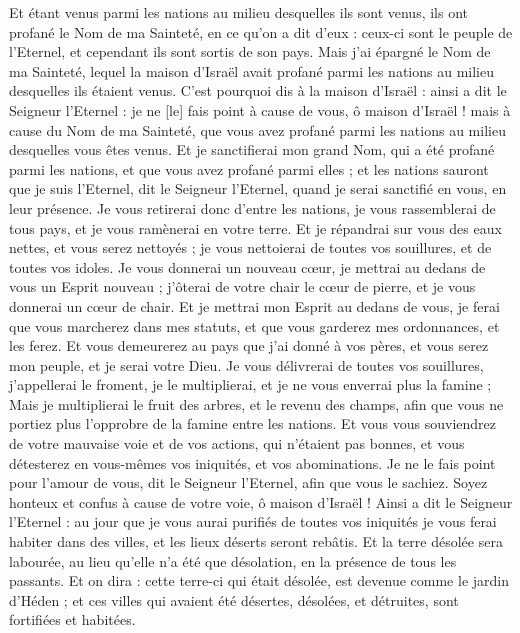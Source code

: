 \begin{multicols}{2}
Et étant venus parmi les nations au milieu desquelles ils sont venus, ils ont profané le Nom de ma Sainteté, en ce qu'on a dit d'eux : ceux-ci sont le peuple de l'Eternel, et cependant ils sont sortis de son pays.
Mais j'ai épargné le Nom de ma Sainteté, lequel la maison d'Israël avait profané parmi les nations au milieu desquelles ils étaient venus.
C'est pourquoi dis à la maison d'Israël : ainsi a dit le Seigneur l'Eternel : je ne [le] fais point à cause de vous, ô maison d'Israël ! mais à cause du Nom de ma Sainteté, que vous avez profané parmi les nations au milieu desquelles vous êtes venus.
Et je sanctifierai mon grand Nom, qui a été profané parmi les nations, et que vous avez profané parmi elles ; et les nations sauront que je suis l'Eternel, dit le Seigneur l'Eternel, quand je serai sanctifié en vous, en leur présence.
Je vous retirerai donc d'entre les nations, je vous rassemblerai de tous pays, et je vous ramènerai en votre terre.
Et je répandrai sur vous des eaux nettes, et vous serez nettoyés ; je vous nettoierai de toutes vos souillures, et de toutes vos idoles.
Je vous donnerai un nouveau cœur, je mettrai au dedans de vous un Esprit nouveau ; j'ôterai de votre chair le cœur de pierre, et je vous donnerai un cœur de chair.
Et je mettrai mon Esprit au dedans de vous, je ferai que vous marcherez dans mes statuts, et que vous garderez mes ordonnances, et les ferez.
Et vous demeurerez au pays que j'ai donné à vos pères, et vous serez mon peuple, et je serai votre Dieu.
Je vous délivrerai de toutes vos souillures, j'appellerai le froment, je le multiplierai, et je ne vous enverrai plus la famine ;
Mais je multiplierai le fruit des arbres, et le revenu des champs, afin que vous ne portiez plus l'opprobre de la famine entre les nations.
Et vous vous souviendrez de votre mauvaise voie et de vos actions, qui n'étaient pas bonnes, et vous détesterez en vous-mêmes vos iniquités, et vos abominations.
Je ne le fais point pour l'amour de vous, dit le Seigneur l'Eternel, afin que vous le sachiez. Soyez honteux et confus à cause de votre voie, ô maison d'Israël !
Ainsi a dit le Seigneur l'Eternel : au jour que je vous aurai purifiés de toutes vos iniquités je vous ferai habiter dans des villes, et les lieux déserts seront rebâtis.
Et la terre désolée sera labourée, au lieu qu'elle n'a été que désolation, en la présence de tous les passants.
Et on dira : cette terre-ci qui était désolée, est devenue comme le jardin d'Héden ; et ces villes qui avaient été désertes, désolées, et détruites, sont fortifiées et habitées.

\end{multicols}
